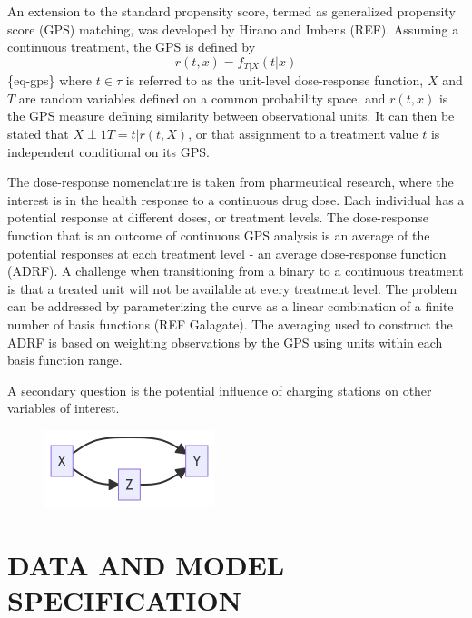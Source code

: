 \documentclass[
  letterpaper,
  DIV=11,
  numbers=noendperiod]{scrartcl}
\begin{document}
An extension to the standard propensity score, termed as generalized
propensity score (GPS) matching, was developed by Hirano and Imbens
(REF). Assuming a continuous treatment, the GPS is defined by
\[r(t,x)=f_{T|X}(t|x)\] \{eq-gps\} where \(t\in \tau\) is referred to as
the unit-level dose-response function, \(X\) and \(T\) are random
variables defined on a common probability space, and \(r(t,x)\) is the
GPS measure defining similarity between observational units. It can then
be stated that \(X\perp 1{T=t}|r(t,X)\), or that assignment to a
treatment value \(t\) is independent conditional on its GPS.

The dose-response nomenclature is taken from pharmeutical research,
where the interest is in the health response to a continuous drug dose.
Each individual has a potential response at different doses, or
treatment levels. The dose-response function that is an outcome of
continuous GPS analysis is an average of the potential responses at each
treatment level - an average dose-response function (ADRF). A challenge
when transitioning from a binary to a continuous treatment is that a
treated unit will not be available at every treatment level. The problem
can be addressed by parameterizing the curve as a linear combination of
a finite number of basis functions (REF Galagate). The averaging used to
construct the ADRF is based on weighting observations by the GPS using
units within each basis function range.

A secondary question is the potential influence of charging stations on
other variables of interest.

\begin{figure}[H]

{\centering \includegraphics[width=1.96in,height=0.89in]{TRB_2023_files/figure-latex/mermaid-figure-1.png}

}

\end{figure}

\hypertarget{data-and-model-specification}{%
\section{DATA AND MODEL
SPECIFICATION}\label{data-and-model-specification}}
\end{document}
